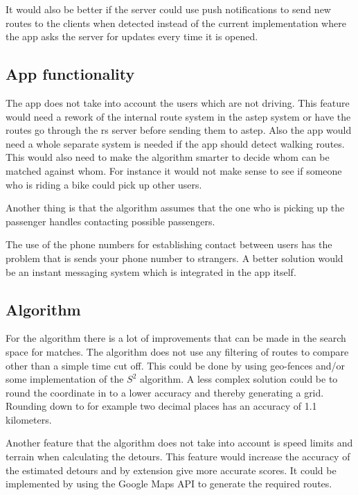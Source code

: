 It would also be better if the server could use push notifications to send new routes to the clients when detected instead of the current implementation where the app asks the server for updates every time it is opened.

\subsection{App functionality}

The app does not take into account the users which are not driving.
This feature would need a rework of the internal route system in the \gls{astep} system or have the routes go through the \gls{rs} server before sending them to \gls{astep}.
Also the app would need a whole separate system is needed if the app should detect walking routes.
This would also need to make the algorithm smarter to decide whom can be matched against whom.
For instance it would not make sense to see if someone who is riding a bike could pick up other users.

Another thing is that the algorithm assumes that the one who is picking up the passenger handles contacting possible passengers.


The use of the phone numbers for establishing contact between users has the problem that is sends your phone number to strangers.
A better solution would be an instant messaging system which is integrated in the app itself.

\subsection{Algorithm}
For the algorithm there is a lot of improvements that can be made in the search space for matches.
The algorithm does not use any filtering of routes to compare other than a simple time cut off.
This could be done by using geo-fences and/or some implementation of the $S^2$ algorithm.
A less complex solution could be to round the coordinate in to a lower accuracy and thereby generating a grid.
Rounding down to for example two decimal places has an accuracy of 1.1 kilometers.

Another feature that the algorithm does not take into account is speed limits and terrain when calculating the detours.
This feature would increase the accuracy of the estimated detours and by extension give more accurate scores.
It could be implemented by using the Google Maps API to generate the required routes.

